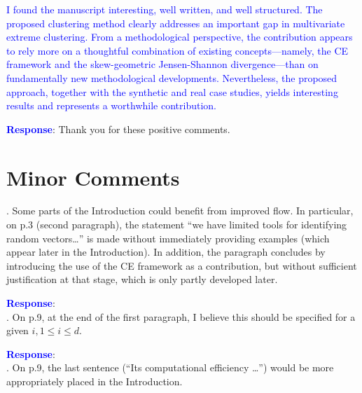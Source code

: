 \documentclass[a4paper,12pt]{article}
\begin{document}
\noindent \textcolor{blue}{
I found the manuscript interesting, well written, and well structured. 
The proposed clustering method clearly addresses an important gap in multivariate extreme clustering. 
From a methodological perspective, the contribution appears to rely more on a thoughtful combination of existing concepts—namely, the CE framework and the skew-geometric Jensen-Shannon divergence—than on fundamentally new methodological developments. 
Nevertheless, the proposed approach, together with the synthetic and real case studies, yields interesting results and represents a worthwhile contribution.
}

\noindent \textcolor{blue}{\bf Response}: Thank you for these positive comments.\\


\section*{{Minor Comments}}


{\color{blue}
. Some parts of the Introduction could benefit from improved flow. In particular, on p.3 (second paragraph), the statement ``we have limited tools for identifying random vectors\ldots'' is made without immediately providing examples (which appear later in the Introduction). 
In addition, the paragraph concludes by introducing the use of the CE framework as a contribution, but without sufficient justification at that stage, which is only partly developed later.
}

\noindent \textcolor{blue}{\bf Response}: \\


{\color{blue}
. On p.9, at the end of the first paragraph, I believe this should be specified for a given $i, 1 \le i \le d$. 
}

\noindent \textcolor{blue}{\bf Response}: \\


{\color{blue}
. On p.9, the last sentence (``Its computational efficiency \ldots'') would be more appropriately placed in the Introduction.
}
\end{document}
